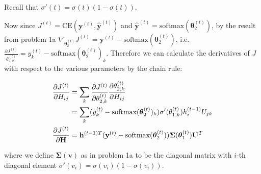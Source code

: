 \documentclass{article}
\begin{document}
\begin{itemize}
    Recall that $\sigma'(t) = \sigma(t)(1-\sigma(t))$.
    
    Now since $J^{(t)} = \text{CE}(\mathbf{y}^{(t)}, \hat{\mathbf{y}}^{(t)})$ and $\hat{\mathbf{y}}^{(t)} = \text{softmax}(\boldsymbol{\theta}_2^{(t)})$, by the result from problem 1a $\nabla_{\boldsymbol{\theta}_2^{(t)}} J^{(t)} = \mathbf{y}^{(t)} - \text{softmax}(\boldsymbol{\theta}_2^{(t)})$, i.e. $\frac{\partial J^{(t)}}{\theta_{2, k}^{(t)}} = y_k^{(t)} - \text{softmax}(\boldsymbol{\theta}_2^{(t)})_k$. Therefore we can calculate the derivatives of $J$ with respect to the various parameters by the chain rule:
    
    \begin{align*}
        \frac{\partial J^{(t)}}{\partial H_{ij}} &= \sum_k \frac{\partial J^{(t)}}{\partial \theta_{2, k}^{(t)}} \frac{\partial \theta_{2, k}^{(t)}}{\partial H_{ij}}\\
        &= \sum_k (y_k^{(t)} - \text{softmax}(\boldsymbol{\theta}_2^{(t)})_k) \sigma'(\theta_{1, k}^{(t)}) h_{i}^{(t-1)} U_{j k}\\
        \frac{\partial J^{(t)}}{\partial \bold{H}} &= \mathbf{h}^{(t-1)T}(\mathbf{y}^{(t)}-\text{softmax}(\boldsymbol{\theta}_2^{(t)}))\boldsymbol{\Sigma}(\boldsymbol{\theta}_1^{(t)}) \mathbf{U}^T
    \end{align*}
    
    where we define $\boldsymbol{\Sigma}(\mathbf{v})$ as in problem 1a to be the diagonal matrix with $i$-th diagonal element $\sigma'(v_i)=\sigma(v_i)(1-\sigma(v_i))$.
    

\end{itemize}
\end{document}
